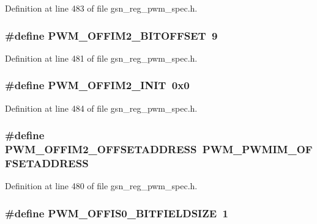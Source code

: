 Definition at line 483 of file gsn\_\-reg\_\-pwm\_\-spec.h.

\hypertarget{a00565_aae30b9dc7ec99f0e396dfb033776a1ce}{
\subsubsection[{PWM\_\-OFFIM2\_\-BITOFFSET}]{\setlength{\rightskip}{0pt plus 5cm}\#define PWM\_\-OFFIM2\_\-BITOFFSET~9}}
\label{a00565_aae30b9dc7ec99f0e396dfb033776a1ce}


Definition at line 481 of file gsn\_\-reg\_\-pwm\_\-spec.h.

\hypertarget{a00565_a61b870db47a70b6912fbe4a99ce2f353}{
\subsubsection[{PWM\_\-OFFIM2\_\-INIT}]{\setlength{\rightskip}{0pt plus 5cm}\#define PWM\_\-OFFIM2\_\-INIT~0x0}}
\label{a00565_a61b870db47a70b6912fbe4a99ce2f353}


Definition at line 484 of file gsn\_\-reg\_\-pwm\_\-spec.h.

\hypertarget{a00565_a64c5144c2e49b2ba331da85235747794}{
\subsubsection[{PWM\_\-OFFIM2\_\-OFFSETADDRESS}]{\setlength{\rightskip}{0pt plus 5cm}\#define PWM\_\-OFFIM2\_\-OFFSETADDRESS~PWM\_\-PWMIM\_\-OFFSETADDRESS}}
\label{a00565_a64c5144c2e49b2ba331da85235747794}


Definition at line 480 of file gsn\_\-reg\_\-pwm\_\-spec.h.

\hypertarget{a00565_a522485998071a566658c5e5053fd7a16}{
\subsubsection[{PWM\_\-OFFIS0\_\-BITFIELDSIZE}]{\setlength{\rightskip}{0pt plus 5cm}\#define PWM\_\-OFFIS0\_\-BITFIELDSIZE~1}}
\label{a00565_a522485998071a566658c5e5053fd7a16}


